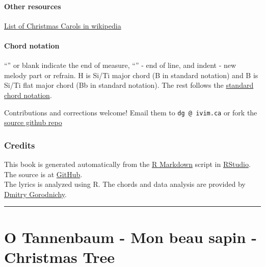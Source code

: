 \documentclass[
]{article}
\begin{document}
\hypertarget{other-resources}{%
\paragraph*{Other resources}\label{other-resources}}

\href{https://en.wikipedia.org/wiki/List_of_Christmas_carols}{List of
Christmas Carols in wikipedia}

\hypertarget{chord-notation}{%
\paragraph*{Chord notation}\label{chord-notation}}

``\textbar{}'' or blank indicate the end of measure,
``\textbar\textbar{}'' - end of line, and indent - new melody part or
refrain. H is Si/Ti major chord (B in standard notation) and B is Si/Ti
flat major chord (Bb in standard notation). The rest follows the
\href{https://en.wikipedia.org/wiki/Chord_letters}{standard chord
notation}.

Contributions and corrections welcome! Email them to
\texttt{dg\ @\ ivim.ca} or fork the
\href{https://github.com/gorodnichy/noel}{source github repo}

\hypertarget{credits}{%
\subsubsection*{Credits}\label{credits}}

This book is generated automatically from the
\href{https://rmarkdown.rstudio.com/}{R Markdown} script in
\href{https://rstudio.cloud}{RStudio}. The source is at
\href{https://github.com/IVI-M/noel}{GitHub}.\\
The lyrics is analyzed using R. The chords and data analysis are
provided by \href{http://www.gorodnichy.ca}{Dmitry Gorodnichy}.

\begin{center}\rule{0.5\linewidth}{0.5pt}\end{center}

\hypertarget{o-tannenbaum---mon-beau-sapin---christmas-tree}{%
\section{O Tannenbaum - Mon beau sapin - Christmas
Tree}\label{o-tannenbaum---mon-beau-sapin---christmas-tree}}
\end{document}
